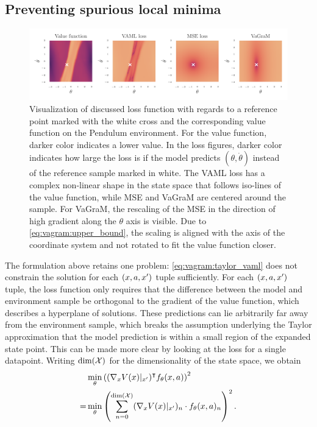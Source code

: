 \subsection{Preventing spurious local minima}
\begin{figure}[!t]
\centering
    \includegraphics[clip, trim=0.cm 0.5cm 0.cm 0.45cm, width=\textwidth]{figures/vagram/all_losses.pdf}
    \caption{{Visualization of discussed loss function with regards to a reference point marked with the white cross and the corresponding value function on the Pendulum environment. For the value function, darker color indicates a lower value. In the loss figures, darker color indicates how large the loss is if the model predicts $(\theta, \dot{\theta})$ instead of the reference sample marked in white. The VAML loss has a complex non-linear shape in the state space that follows iso-lines of the value function, while MSE and VaGraM are centered around the sample. For VaGraM, the rescaling of the MSE in the direction of high gradient along the $\theta$ axis is visible. Due to \autoref{eq:vagram:upper_bound}, the scaling is aligned with the axis of the coordinate system and not rotated to fit the value function closer.}}
    \label{fig:vagram:all_losses}
\end{figure}


The formulation above retains one problem: \autoref{eq:vagram:taylor_vaml} does not constrain the solution for each $(x,a,x')$ tuple sufficiently.
For each $(x,a,x')$ tuple, the loss function only requires that the difference between the model and environment sample be orthogonal to the gradient of the value function, which describes a hyperplane of solutions.
These predictions can lie arbitrarily far away from the environment sample, which breaks the assumption underlying the Taylor approximation that the model prediction is within a small region of the expanded state point.
This can be made more clear by looking at the loss for a single datapoint.
Writing $\text{dim}(\mathcal{X})$ for the dimensionality of the state space, we obtain
\begin{align}
    &\min_\theta \left((\nabla_x V(x)|_{x'})^\intercal f_\theta(x,a) \right) ^2\\
    =&\min_\theta \left(\sum_{n=0}^{\text{dim}(\mathcal{X})} (\nabla_x V(x)|_{x'})_n \cdot f_\theta(x,a)_n\right)^2.
\end{align}

